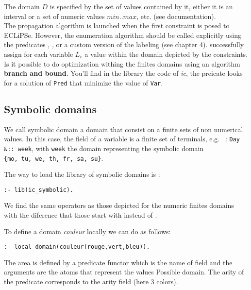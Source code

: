 The domain $D$ is specified by the set of values contained by it, either it is an interval or a set of numeric values $\mathit{min}..\mathit{max}$, etc. (see documentation).\\

The propagation algorithm is launched when the first constraint is posed to ECLiPSe. However, the enumeration algorithm should be called explicitly using the predicates ,
, or a custom version of the labeling (see chapter 4).
%
 successfully assign for each variable 
$L_v$ a value within the domain depicted by the constraints. \\

Is it possible to do optimization withing the finites domains using an algorithm  \textbf{branch and bound}. You'll find in the library the code
 of \emph{ic}, the preicate  looks for a solution of 
\verb|Pred| that minimize the value of \verb|Var|.

\subsection*{Symbolic domains}

We call symbolic domain a domain that consist on a finite sets of non numerical values. In this case, the field of a variable is a finite set of terminals, e.g. ~: \verb|Day &:: week|, with
\verb|week| the domain representing the symbolic domain\\
\verb|{mo, tu, we, th, fr, sa, su}|.

The way to load the library of symbolic domains is :
\begin{verbatim}
:- lib(ic_symbolic).
\end{verbatim}

We find the same operators as those depicted for the numeric finites domains with the diference that those start with 
\code{\&} instead of \code{\#}.

To define a domain \emph{couleur} locally we can do as follows:
\begin{verbatim}
:- local domain(couleur(rouge,vert,bleu)).
\end{verbatim}

The area is defined by a predicate functor which is the name of
field and the arguments are the atoms that represent the values
Possible domain. The arity of the predicate corresponds to the arity
field (here 3 colors).


